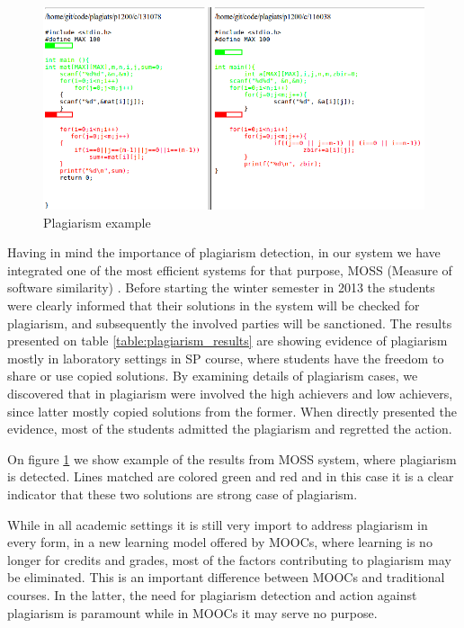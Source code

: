 \documentclass{llncs}
\begin{document}
\begin{figure}[htb]
\centering
\includegraphics[width=.99\textwidth]{code_usage/plagiat_example}
\caption{Plagiarism example}
\label{fig:plagiats_example}
\end{figure}

Having in mind the importance of plagiarism detection, in our system we have
integrated one of the most efficient systems for that purpose, MOSS (Measure of
software similarity) \cite{aiken1994measure}. Before starting the winter
semester in 2013 the students were clearly informed that their solutions in the
system will be checked for plagiarism, and subsequently the involved parties will be
sanctioned. The results presented on table \ref{table:plagiarism_results} are
showing evidence of plagiarism mostly in laboratory settings in SP course, where
students have the freedom to share or use copied solutions. By examining
details of plagiarism cases, we discovered that in plagiarism were involved the
high achievers and low achievers, since latter mostly copied
solutions from the former. When directly presented the evidence, most of the
students admitted the plagiarism and regretted the action.

On figure \ref{fig:plagiats_example} we show example of the results from MOSS
system, where plagiarism is detected. Lines matched are colored green and red
and in this case it is a clear indicator that these two solutions
are strong case of plagiarism.

While in all academic settings it is still very import to address plagiarism in
every form, in a new learning model offered by MOOCs, where learning is no
longer for credits and grades, most of the factors contributing to plagiarism
may be eliminated. This is an important difference between MOOCs and traditional
courses. In the latter, the need for plagiarism detection and action against
plagiarism is paramount while in MOOCs it may serve no purpose.
\end{document}
